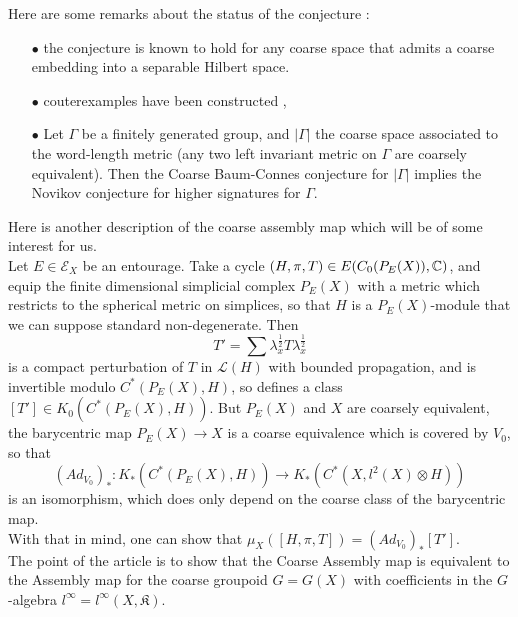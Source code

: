 Here are some remarks about the status of the conjecture :
\begin{itemize}
\item[$\bullet$] the conjecture is known to hold for any coarse space that admits a coarse embedding into a  separable Hilbert space\cite{Yu2}.
\item[$\bullet$] couterexamples have been constructed \cite{HigsonLaffSk},
\item[$\bullet$] Let $\Gamma$ be a finitely generated group, and $|\Gamma|$ the coarse space associated to the word-length metric (any two left invariant metric on $\Gamma$ are coarsely equivalent). Then the Coarse Baum-Connes conjecture for $|\Gamma|$ implies the Novikov conjecture for higher signatures for $\Gamma$.\\
\end{itemize}

Here is another description of the coarse assembly map which will be of some interest for us.\\

Let $E\in \mathcal E_X$ be an entourage. Take a cycle $(H,\pi, T)\in E(C_0(P_E(X)), \mathbb C)$, and equip the finite dimensional simplicial complex $P_E(X)$ with a metric which restricts to the spherical metric on simplices, so that $H$ is a $P_E(X)$-module that we can suppose standard non-degenerate. Then 
\[T'=\sum \lambda_x^{\frac{1}{2}} T \lambda_x^{\frac{1}{2}} \] 
is a compact perturbation of $T$ in $\mathcal L(H)$ with bounded propagation, and is invertible modulo $C^*(P_E(X),H)$, so defines a class $[T']\in K_0(C^*(P_E(X),H))$. But $P_E(X)$ and $X$ are coarsely equivalent, the barycentric map $P_E(X)\rightarrow X$ is a coarse equivalence which is covered by $V_0$, so that 
\[(Ad_{V_0})_* : K_*(C^*(P_E(X),H))\rightarrow K_*(C^*(X,l^2(X)\otimes H))\]
is an isomorphism, which does only depend on the coarse class of the barycentric map.\\

With that in mind, one can show that $\mu_{X}([H,\pi,T])=(Ad_{V_0})_*[T']$.\\

The point of the article \cite{SkTuYu} is to show that the Coarse Assembly map is equivalent to the Assembly map for the coarse groupoid $G=G(X)$ with coefficients in the $G$-algebra $l^\infty=l^\infty(X,\mathfrak K)$. \\

